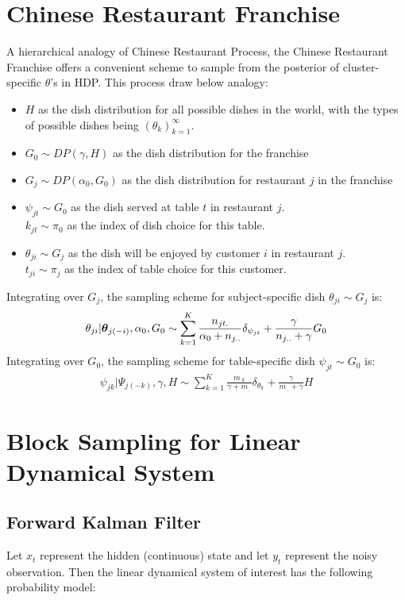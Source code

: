 \documentclass{article} %
\begin{document}
\section{Chinese Restaurant Franchise}\label{sec:CRF}
A hierarchical analogy of Chinese Restaurant Process, the Chinese Restaurant Franchise offers a convenient scheme to sample from the posterior of cluster-specific $\theta$'s in HDP. This process draw below analogy:
\begin{itemize}
\item $H$ as the dish distribution for all possible dishes in the world, with the types of possible dishes being $(\theta_k)_{k=1}^\infty$.
\item  $G_0 \sim DP(\gamma, H)$ as the dish distribution for the franchise
\item $G_j \sim DP(\alpha_0, G_0)$ as the dish distribution for restaurant $j$ in the franchise
\item $\psi_{jt} \sim G_0$ as the dish served at table $t$ in restaurant $j$.\\ $k_{jt} \sim \pi_0$ as the index of dish choice for this table.
\item $\theta_{ji} \sim G_j$ as the dish will be enjoyed by customer $i$ in restaurant $j$. \\
$t_{ji} \sim \pi_j$ as the index of table choice for this customer.
\end{itemize}
Integrating over $G_j$, the sampling scheme for subject-specific dish $\theta_{ji} \sim G_j$ is:
\begin{align*}
\theta_{ji} | \boldsymbol{\theta}_{j(-i)}, \alpha_0, G_0 \sim
\sum_{k=1}^K \frac{n_{jt.}}{\alpha_0 + n_{j..}} \delta_{\psi_{jt}} +
\frac{\gamma}{n_{j..} + \gamma} G_0
\end{align*}
Integrating over $G_0$, the sampling scheme for table-specific dish $\psi_{jt} \sim G_0$ is:
\begin{align*}
\psi_{jk} | \Psi_{j(-k)}, \gamma, H \sim
\sum_{k=1}^K \frac{m_{.k}}{\gamma + m_{..}} \delta_{\theta_{k}} +
\frac{\gamma}{m_{..} + \gamma} H
\end{align*}

\section{Block Sampling for Linear Dynamical System} \label{sec:ap_kalman}
\subsection{Forward Kalman Filter}
Let $x_t$ represent the hidden (continuous) state and let $y_t$ represent the noisy observation. Then the linear dynamical system of interest has the following probability model:
\end{document}
